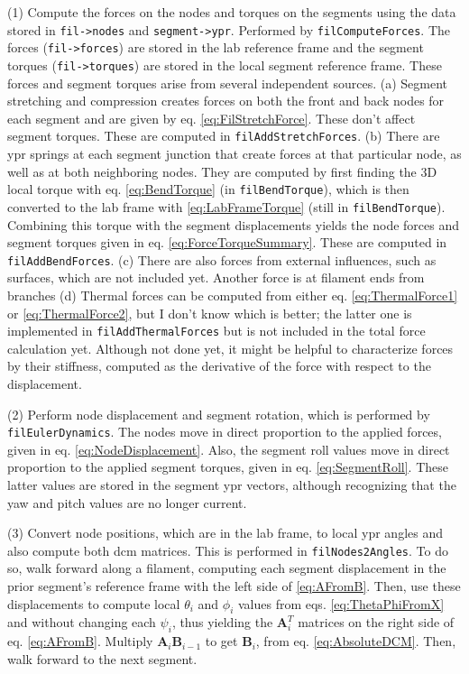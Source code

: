 \documentclass {scrbook}
\newcommand {\ttt} {\texttt}
\begin{document}
(1) Compute the forces on the nodes and torques on the segments using the data stored in \ttt{fil->nodes} and \ttt{segment->ypr}. Performed by \ttt{filComputeForces}. The forces (\ttt{fil->forces}) are stored in the lab reference frame and the segment torques (\ttt{fil->torques}) are stored in the local segment reference frame. These forces and segment torques arise from several independent sources. (a) Segment stretching and compression creates forces on both the front and back nodes for each segment and are given by eq. \ref{eq:FilStretchForce}. These don't affect segment torques. These are computed in \ttt{filAddStretchForces}. (b) There are ypr springs at each segment junction that create forces at that particular node, as well as at both neighboring nodes. They are computed by first finding the 3D local torque with eq. \ref{eq:BendTorque} (in \ttt{filBendTorque}), which is then converted to the lab frame with \ref{eq:LabFrameTorque} (still in \ttt{filBendTorque}). Combining this torque with the segment displacements yields the node forces and segment torques given in eq. \ref{eq:ForceTorqueSummary}. These are computed in \ttt{filAddBendForces}. (c) There are also forces from external influences, such as surfaces, which are not included yet. Another force is at filament ends from branches (d) Thermal forces can be computed from either eq. \ref{eq:ThermalForce1} or \ref{eq:ThermalForce2}, but I don't know which is better; the latter one is implemented in \ttt{filAddThermalForces} but is not included in the total force calculation yet. Although not done yet, it might be helpful to characterize forces by their stiffness, computed as the derivative of the force with respect to the displacement.

(2) Perform node displacement and segment rotation, which is performed by \ttt{filEulerDynamics}. The nodes move in direct proportion to the applied forces, given in eq. \ref{eq:NodeDisplacement}. Also, the segment roll values move in direct proportion to the applied segment torques, given in eq. \ref{eq:SegmentRoll}. These latter values are stored in the segment ypr vectors, although recognizing that the yaw and pitch values are no longer current.

(3) Convert node positions, which are in the lab frame, to local ypr angles and also compute both dcm matrices. This is performed in \ttt{filNodes2Angles}. To do so, walk forward along a filament, computing each segment displacement in the prior segment's reference frame with the left side of \ref{eq:AFromB}. Then, use these displacements to compute local $\theta_i$ and $\phi_i$ values from eqs. \ref{eq:ThetaPhiFromX} and without changing each $\psi_i$, thus yielding the $\bm{A}_i^T$ matrices on the right side of eq. \ref{eq:AFromB}. Multiply $\bm{A}_i \bm{B}_{i-1}$ to get $\bm{B}_i$, from eq. \ref{eq:AbsoluteDCM}. Then, walk forward to the next segment.
\end{document}
